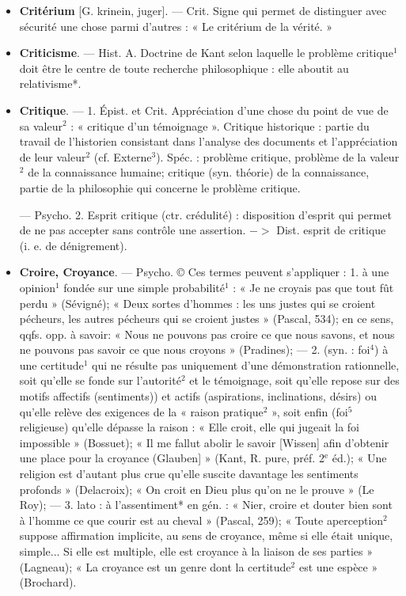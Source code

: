 \begin{itemize}[leftmargin=1cm, label=, itemsep=11pt]
\item {\bf Critérium} [G. krinein, juger]. — Crit.
Signe qui permet de distinguer avec
sécurité une chose parmi d’autres :
« Le critérium de la vérité. »

\item {\bf Criticisme}. — Hist. A. Doctrine de
Kant selon laquelle le problème
critique$^1$ doit être le centre de toute
recherche philosophique : elle aboutit
au relativisme*.

\item {\bf Critique}. — 1. Épist. et Crit. Appréciation d’une chose du point de vue
de sa valeur$^2$ : « critique d’un témoignage ». Critique historique : partie
du travail de l'historien consistant
dans l'analyse des documents et
l'appréciation de leur valeur$^2$ (cf.
Externe$^3$). Spéc. : problème critique,
problème de la valeur$^2$ de la connaissance humaine; critique (syn.
théorie) de la connaissance, partie de
la philosophie qui concerne le problème critique.

— Psycho. 2. Esprit critique (ctr.
crédulité) : disposition d'esprit qui
permet de ne pas accepter sans contrôle une assertion. $->$ Dist. esprit
de critique (i. e. de dénigrement).

\item {\bf Croire, Croyance}. — Psycho. © Ces
termes peuvent s’appliquer : 1. à
une opinion$^1$ fondée sur une simple
probabilité$^1$ : « Je ne croyais pas que
tout fût perdu » (Sévigné); « Deux
sortes d'hommes : les uns justes qui
se croient pécheurs, les autres pécheurs qui se croient justes » (Pascal,
534); en ce sens, qqfs. opp. à savoir:
« Nous ne pouvons pas croire ce que
nous savons, et nous ne pouvons
pas savoir ce que nous croyons »
(Pradines); — 2. (syn. : foi$^4$) à une
certitude$^1$ qui ne résulte pas uniquement d'une démonstration rationnelle, soit qu’elle se fonde sur l’autorité$^2$ et le témoignage, soit qu'elle
repose sur des motifs affectifs (sentiments)) et actifs (aspirations, inclinations, désirs) ou qu'elle relève des
exigences de la « raison pratique$^2$ »,
soit enfin (foi$^5$ religieuse) qu’elle
dépasse la raison : « Elle croit, elle
qui jugeait la foi impossible »
(Bossuet); « Il me fallut abolir le
savoir [Wissen] afin d'obtenir une
place pour la croyance (Glauben] »
(Kant, R. pure, préf. 2$^\text{e}$ éd.); « Une
religion est d’autant plus crue qu’elle
suscite davantage les sentiments
profonds » (Delacroix); « On croit en
Dieu plus qu’on ne le prouve » (Le
Roy); — 3. lato : à l'assentiment* en
gén. : « Nier, croire et douter bien
sont à l’homme ce que courir est au
cheval » (Pascal, 259); « Toute aperception$^2$ suppose affirmation implicite, au sens de croyance, même si
elle était unique, simple... Si elle
est multiple, elle est croyance à la
liaison de ses parties » (Lagneau);
« La croyance est un genre dont
la certitude$^2$ est une espèce » (Brochard).


\end{itemize}
